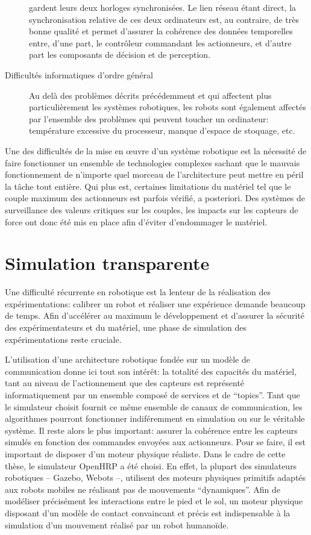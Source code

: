 \begin{description}
  gardent leurs deux horloges synchronisées. Le lien réseau étant
  direct, la synchronisation relative de ces deux ordinateurs est, au
  contraire, de très bonne qualité et permet d'assurer la cohérence
  des données temporelles entre, d'une part, le contrôleur commandant
  les actionneurs, et d'autre part les composants de décision et de
  perception.
\item[Difficultés informatiques d'ordre général] Au delà des problèmes
  décrits précédemment et qui affectent plus particulièrement les
  systèmes robotiques, les robots sont également affectés par
  l'ensemble des problèmes qui peuvent toucher un ordinateur:
  température excessive du processeur, manque d'espace de stoquage,
  etc.
\end{description}

Une des difficultés de la mise en \oe uvre d'un système robotique est
la nécessité de faire fonctionner un ensemble de technologies
complexes sachant que le mauvais fonctionnement de n'importe quel
morceau de l'architecture peut mettre en péril la tâche tout
entière. Qui plus est, certaines limitations du matériel tel que le
couple maximum des actionneurs est parfois vérifié, a posteriori. Des
systèmes de surveillance des valeurs critiques sur les couples, les
impacts sur les capteurs de force ont donc été mis en place afin
d'éviter d'endommager le matériel.


\section{Simulation transparente}


Une difficulté récurrente en robotique est la lenteur de la
réalisation des expérimentations: calibrer un robot et réaliser une
expérience demande beaucoup de temps. Afin d'accélérer au maximum le
développement et d'assurer la sécurité des expérimentateurs et du
matériel, une phase de simulation des expérimentations reste cruciale.


L'utilisation d'une architecture robotique fondée sur un modèle de
communication donne ici tout son intérêt: la totalité des capacités du
matériel, tant au niveau de l'actionnement que des capteurs est
représenté informatiquement par un ensemble composé de services et de
``topics''. Tant que le simulateur choisit fournit ce même ensemble de
canaux de communication, les algorithmes pourront fonctionner
indiféremment en simulation ou sur le véritable système. Il reste
alors le plus important: assurer la cohérence entre les capteurs
simulés en fonction des commandes envoyées aux actionneurs. Pour se
faire, il est important de disposer d'un moteur physique
réaliste. Dans le cadre de cette thèse, le simulateur OpenHRP a été
choisi. En effet, la plupart des simulateurs robotiques -- Gazebo,
Webots --, utilisent des moteurs physiques primitifs adaptés aux
robots mobiles ne réalisant pas de mouvements ``dynamiques''. Afin de
modéliser précisément les interactions entre le pied et le sol, un
moteur physique disposant d'un modèle de contact convaincant et précis
est indispensable à la simulation d'un mouvement réalisé par un robot
humanoïde.


